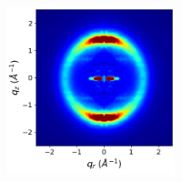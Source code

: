 \documentclass[journal=jpcbfk,manusciprt=article]{achemso}
\begin{document}
\begin{figure}[!htb]
\begin{subfigure}{0.88\textwidth}
\begin{subfigure}{0.28\linewidth}
\begin{subfigure}{\textwidth}
		        	\includegraphics[width=\linewidth]{rzplot_offset_300K_jet_nocbar.png}
			\end{subfigure}
			

\end{subfigure}
\end{subfigure}
\end{figure}
\end{document}
